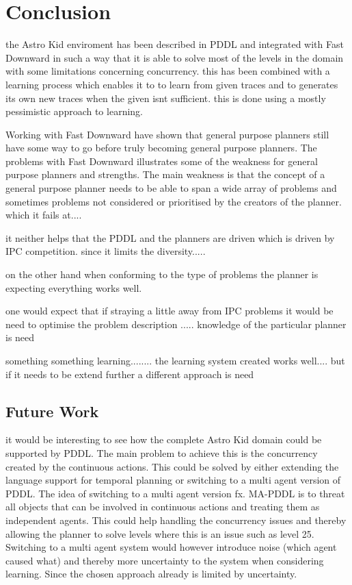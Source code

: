\section{Conclusion}

the Astro Kid enviroment has been described in PDDL and integrated with Fast Downward in such a way that it is able to solve most of the levels in the domain with some limitations concerning concurrency. this has been combined with a learning process which enables it to to learn from given traces and to generates its own new traces when the given isnt sufficient. this is done using a mostly pessimistic approach to learning.


Working with Fast Downward have shown that general purpose planners still have some way to go before truly becoming general purpose planners. The problems with Fast Downward illustrates some of the weakness for general purpose planners and strengths. The main weakness is that the concept of a general purpose planner needs to be able to span a wide array of problems and sometimes problems not considered or prioritised by the creators of the planner. which it fails at....

it neither helps that the PDDL and the planners are driven which is driven by IPC competition. 
 since it limits the diversity..... 
 
 on the other hand when conforming to the type of problems the planner is expecting everything works well.
 
 one would expect that if straying a little away from IPC problems it would be need to optimise the problem description ..... knowledge of the particular planner is need
 
 
 
 
 something something learning........
 the learning system created works well.... but if it needs to be extend further a different approach is need
 
 
\subsection{Future Work}

	it would be interesting to see how the complete Astro Kid domain could be supported by PDDL. The main problem to achieve this is the concurrency created by the continuous actions. This could be solved by either extending the language support for temporal planning or switching to a multi agent version of PDDL. The idea of switching to a multi agent version fx. MA-PDDL is to threat all objects that can be involved in continuous actions and treating them as independent agents. This could help handling the concurrency issues and thereby allowing the planner to solve levels where this is an issue such as level 25. Switching to a multi agent system would however introduce noise (which agent caused what) and thereby more uncertainty to the system when considering learning. Since the chosen approach already is limited by uncertainty.
	
